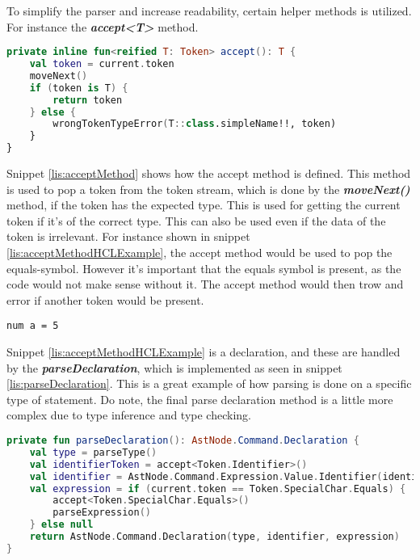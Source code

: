 To simplify the parser and increase readability, certain helper methods is utilized. For instance the \textit{\textbf{accept<T>}} method. 
\begin{lstlisting}[language=Kotlin,label={lis:acceptMethod},caption=The definition of the accept method on the parser]
private inline fun<reified T: Token> accept(): T {
	val token = current.token
	moveNext()
	if (token is T) {
		return token
	} else {
		wrongTokenTypeError(T::class.simpleName!!, token)
	}
}
\end{lstlisting}
Snippet \ref{lis:acceptMethod} shows how the accept method is defined.
This method is used to pop a token from the token stream, which is done by the \textit{\textbf{moveNext()}} method, if the token has the expected type.
This is used for getting the current token if it's of the correct type. This can also be used even if the data of the token is irrelevant.
For instance shown in snippet \ref{lis:acceptMethodHCLExample}, the accept method would be used to pop the equals-symbol. However it's important that the equals symbol is present, as the code would not make sense without it. The accept method would then trow and error if another token would be present.

\begin{lstlisting}[language=HCL,label={lis:acceptMethodHCLExample},caption={An example of a declaration in HCL, where the accept method is used by the parser.}]
num a = 5
\end{lstlisting}
Snippet \ref{lis:acceptMethodHCLExample} is a declaration, and these are handled by the \textit{\textbf{parseDeclaration}}, which is implemented as seen in snippet \ref{lis:parseDeclaration}. This is a great example of how parsing is done on a specific type of statement.
Do note, the final parse declaration method is a little more complex due to type inference and type checking.

\begin{lstlisting}[language=Kotlin,label=lis:parseDeclaration,caption=A simplified version of the parse declaration method from the parser.]
private fun parseDeclaration(): AstNode.Command.Declaration {
    val type = parseType()
    val identifierToken = accept<Token.Identifier>()
    val identifier = AstNode.Command.Expression.Value.Identifier(identifierToken.value)
    val expression = if (current.token == Token.SpecialChar.Equals) {
	    accept<Token.SpecialChar.Equals>()
	    parseExpression()
    } else null
    return AstNode.Command.Declaration(type, identifier, expression)
}
\end{lstlisting}

